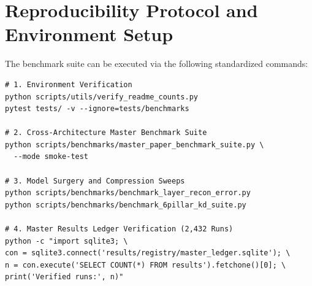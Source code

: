 \documentclass{article}
\begin{document}
\section{Reproducibility Protocol and Environment Setup}
\label{app:reproducibility}
The benchmark suite can be executed via the following standardized commands:
\begin{verbatim}
# 1. Environment Verification
python scripts/utils/verify_readme_counts.py
pytest tests/ -v --ignore=tests/benchmarks

# 2. Cross-Architecture Master Benchmark Suite
python scripts/benchmarks/master_paper_benchmark_suite.py \
  --mode smoke-test

# 3. Model Surgery and Compression Sweeps
python scripts/benchmarks/benchmark_layer_recon_error.py
python scripts/benchmarks/benchmark_6pillar_kd_suite.py

# 4. Master Results Ledger Verification (2,432 Runs)
python -c "import sqlite3; \
con = sqlite3.connect('results/registry/master_ledger.sqlite'); \
n = con.execute('SELECT COUNT(*) FROM results').fetchone()[0]; \
print('Verified runs:', n)"
\end{verbatim}
\end{document}
